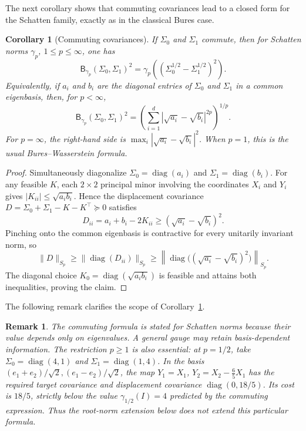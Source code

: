 \documentclass{article}
\newtheorem{corollary}[theorem]{Corollary}
\newtheorem{remark}[theorem]{Remark}
\newcommand{\diag}{\operatorname{diag}}
\newcommand{\abs}[1]{\left\lvert #1 \right\rvert}
\begin{document}
The next corollary shows that commuting covariances lead to a closed form for the Schatten family, exactly as in the classical Bures case.
\begin{corollary}[Commuting covariances]
\label{app-cor:commuting}
If $\Sigma_0$ and $\Sigma_1$ commute, then for Schatten norms $\gamma_p$,
$1\le p\le\infty$, one has
$$
\mathsf B_{\gamma_p}(\Sigma_0,\Sigma_1)^2
=
\gamma_p\!\left(
(\Sigma_0^{1/2}-\Sigma_1^{1/2})^2
\right).
$$
Equivalently, if $a_i$ and $b_i$ are the diagonal entries of $\Sigma_0$ and
$\Sigma_1$ in a common eigenbasis, then, for $p<\infty$,
$$
\mathsf B_{\gamma_p}(\Sigma_0,\Sigma_1)^2
=
\left(
\sum_{i=1}^d \abs{\sqrt{a_i}-\sqrt{b_i}}^{2p}
\right)^{1/p}.
$$
For $p=\infty$, the right-hand side is
$\max_i|\sqrt{a_i}-\sqrt{b_i}|^2$.
When $p=1$, this is the usual Bures--Wasserstein formula.
\end{corollary}

\begin{proof}
Simultaneously diagonalize $\Sigma_0=\diag(a_i)$ and
$\Sigma_1=\diag(b_i)$. For any feasible $K$, each $2\times2$ principal
minor involving the coordinates $X_i$ and $Y_i$ gives
$|K_{ii}|\le\sqrt{a_ib_i}$. Hence the displacement covariance
$D=\Sigma_0+\Sigma_1-K-K^\top\succeq0$ satisfies
\[
 D_{ii}=a_i+b_i-2K_{ii}
 \ge(\sqrt{a_i}-\sqrt{b_i})^2.
\]
Pinching onto the common eigenbasis is contractive for every unitarily
invariant norm, so
\[
 \|D\|_{S_p}
 \ge\|\diag(D_{ii})\|_{S_p}
 \ge\left\|\diag\bigl((\sqrt{a_i}-\sqrt{b_i})^2\bigr)\right\|_{S_p}.
\]
The diagonal choice $K_0=\diag(\sqrt{a_ib_i})$ is feasible and attains both
inequalities, proving the claim.
\end{proof}

The following remark clarifies the scope of Corollary~\ref{app-cor:commuting}.
\begin{remark}
The commuting formula is stated for Schatten norms because their value
depends only on eigenvalues. A general gauge may retain basis-dependent
information. The restriction $p\ge1$ is also essential: at $p=1/2$, take
$\Sigma_0=\diag(4,1)$ and $\Sigma_1=\diag(1,4)$. In the basis
$(e_1+e_2)/\sqrt2,(e_1-e_2)/\sqrt2$, the map
$Y_1=X_1$, $Y_2=X_2-\frac65X_1$ has the required target covariance and
displacement covariance $\diag(0,18/5)$. Its cost is $18/5$, strictly below
the value $\gamma_{1/2}(I)=4$ predicted by the commuting expression.
Thus the root-norm extension below does not extend this particular formula.
\end{remark}


\end{document}
